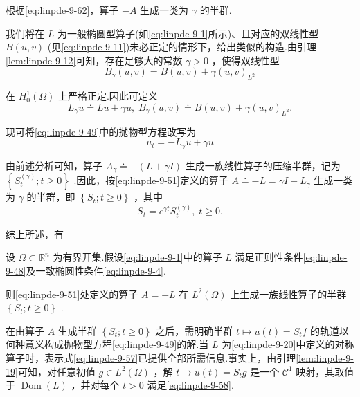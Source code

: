 根据\eqref{eq:linpde-9-62}，算子 $- A$ 生成一类为 $\gamma$ 的半群.

我们将在 $L$ 为一般椭圆型算子(如\eqref{eq:linpde-9-1}所示)、且对应的双线性型 $B\left(  {u,v}\right)$ (见\eqref{eq:linpde-9-11})未必正定的情形下，给出类似的构造.由引理\ref{lem:linpde-9-12}可知，存在足够大的常数 $\gamma  > 0$ ，使得双线性型
\begin{equation}\tag{9.63}\label{eq:linpde-9-63}
{B}_{\gamma }\left(  {u,v}\right)   = B\left(  {u,v}\right)   + \gamma {\left( u,v\right) }_{{L}^{2}}
\end{equation}

在 ${H}_{0}^{1}\left( \Omega \right)$ 上严格正定.因此可定义
\[
{L}_{\gamma }u \doteq  {Lu} + {\gamma u},\;{B}_{\gamma }\left(  {u,v}\right)   \doteq  B\left(  {u,v}\right)   + \gamma {\left( u,v\right) }_{{L}^{2}}.
\]

现可将\eqref{eq:linpde-9-49}中的抛物型方程改写为
\[
{u}_{t} =  - {L}_{\gamma }u + {\gamma u}
\]

由前述分析可知，算子 ${A}_{\gamma } \doteq   - \left( {L + {\gamma I}}\right)$ 生成一族线性算子的压缩半群，记为 $\left\{  {{S}_{t}^{\left( \gamma \right) };t \geq  0}\right\}$ .因此，按\eqref{eq:linpde-9-51}定义的算子 $A \doteq   - L = {\gamma I} - {L}_{\gamma }$ 生成一类为 $\gamma$ 的半群，即 $\left\{  {{S}_{t};t \geq  0}\right\}$ ，其中
\[
{S}_{t} = {e}^{\gamma t}{S}_{t}^{\left( \gamma \right) },\;t \geq  0.
\]

综上所述，有

\begin{theorem}\label{thm:linpde-9-21}
设 $\Omega  \subset  {\mathbb{R}}^{n}$ 为有界开集.假设\eqref{eq:linpde-9-1}中的算子 $L$ 满足正则性条件\eqref{eq:linpde-9-48}及一致椭圆性条件\eqref{eq:linpde-9-4}.

则\eqref{eq:linpde-9-51}处定义的算子 $A =  - L$ 在 ${L}^{2}\left( \Omega \right)$ 上生成一族线性算子的半群 $\left\{  {{S}_{t};t \geq  0}\right\}$ .
\end{theorem}

在由算子 $A$ 生成半群 $\left\{  {{S}_{t};t \geq  0}\right\}$ 之后，需明确半群 $t \mapsto  u\left( t\right)  = {S}_{t}f$ 的轨道以何种意义构成抛物型方程\eqref{eq:linpde-9-49}的解.当 $L$ 为\eqref{eq:linpde-9-20}中定义的对称算子时，表示式\eqref{eq:linpde-9-57}已提供全部所需信息.事实上，由引理\ref{lem:linpde-9-19}可知，对任意初值 $g \in  {L}^{2}\left( \Omega \right)$ ，解 $t \mapsto  u\left( t\right)  = {S}_{t}g$ 是一个 ${\mathcal{C}}^{1}$ 映射，其取值于 $\operatorname{Dom}\left( L\right)$ ，并对每个 $t > 0$ 满足\eqref{eq:linpde-9-58}.

